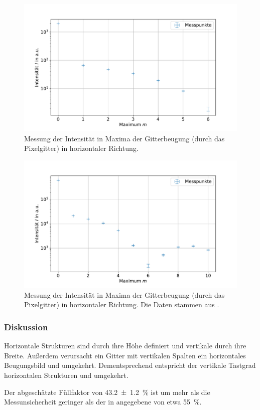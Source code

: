 \documentclass[
	a4paper,
	12pt,
	pagesize,
	ngerman
]{scrartcl}
\begin{document}
\begin{figure}[H]
			\includegraphics[width=0.8\linewidth]{img/sinc2}
			\caption{
			Messung der Intensität in Maxima der Gitterbeugung (durch das Pixelgitter) in horizontaler Richtung.
			}
			\label{fig_sinc2}
	\end{figure}

\begin{figure}[H] %
			\includegraphics[width=0.8\linewidth]{img/sinc3}
			\caption{
			Messung der Intensität in Maxima der Gitterbeugung (durch das Pixelgitter) in horizontaler Richtung.
			Die Daten stammen aus \cite{JTZ}.
			}
			\label{fig_sinc3}
	\end{figure}


			\subsubsection*{Diskussion}
			Horizontale Strukturen sind durch ihre Höhe definiert und vertikale durch ihre Breite.
			Außerdem verursacht ein Gitter mit vertikalen Spalten ein horizontales Beugungsbild und umgekehrt.
			Dementsprechend entspricht der vertikale Tastgrad horizontalen Strukturen und umgekehrt.

			Der abgeschätzte Füllfaktor von \SI{43,2\pm 1,2}{\percent} ist um mehr als die Messunsicherheit geringer als der in \cite{Handbuch} angegebene von etwa \SI{55}{\percent}.
\end{document}
